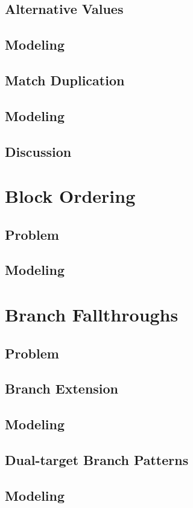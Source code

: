 \subsection{Alternative Values}
\subsection{Modeling}
\subsection{Match Duplication}
\subsection{Modeling}
\subsection{Discussion}

\section{Block Ordering}
\subsection{Problem}
\subsection{Modeling}

\section{Branch Fallthroughs}
\subsection{Problem}
\subsection{Branch Extension}
\subsection{Modeling}
\subsection{Dual-target Branch Patterns}
\subsection{Modeling}
